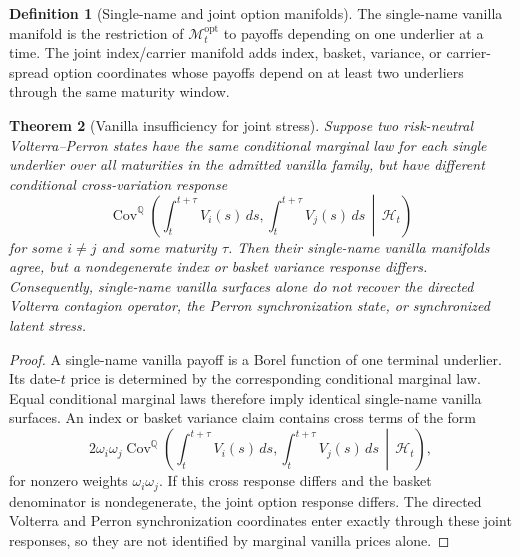 \documentclass[11pt,a4paper]{amsart}
\theoremstyle{plain}
\newtheorem{theorem}{Theorem}[section]
\theoremstyle{definition}
\newtheorem{definition}[theorem]{Definition}
\theoremstyle{remark}
\DeclareMathOperator{\Cov}{Cov}
\newcommand{\QQ}{\mathbb{Q}}
\newcommand{\cH}{\mathcal{H}}
\newcommand{\cM}{\mathcal{M}}
\newcommand{\dd}{\,d}
\begin{document}
\begin{definition}[Single-name and joint option manifolds]\label{def:single-joint-manifolds}
The single-name vanilla manifold is the restriction of \(\cM_t^{\mathrm{opt}}\) to payoffs
depending on one underlier at a time.  The joint index/carrier manifold adds index, basket,
variance, or carrier-spread option coordinates whose payoffs depend on at least two underliers
through the same maturity window.
\end{definition}

\begin{theorem}[Vanilla insufficiency for joint stress]\label{thm:vanilla-insufficiency}
Suppose two risk-neutral Volterra--Perron states have the same conditional marginal law for each
single underlier over all maturities in the admitted vanilla family, but have different conditional
cross-variation response
\[
        \Cov^\QQ\!\left(
        \int_t^{t+\tau}V_i(s)\dd s,
        \int_t^{t+\tau}V_j(s)\dd s
        \,\middle|\,\cH_t
        \right)
\]
for some \(i\ne j\) and some maturity \(\tau\).  Then their single-name vanilla manifolds agree,
but a nondegenerate index or basket variance response differs.  Consequently, single-name
vanilla surfaces alone do not recover the directed Volterra contagion operator, the Perron
synchronization state, or synchronized latent stress.
\end{theorem}

\begin{proof}
A single-name vanilla payoff is a Borel function of one terminal underlier.  Its date-\(t\) price
is determined by the corresponding conditional marginal law.  Equal conditional marginal laws
therefore imply identical single-name vanilla surfaces.  An index or basket variance claim
contains cross terms of the form
\[
        2\omega_i\omega_j
        \Cov^\QQ\!\left(
        \int_t^{t+\tau}V_i(s)\dd s,
        \int_t^{t+\tau}V_j(s)\dd s
        \,\middle|\,\cH_t
        \right),
\]
for nonzero weights \(\omega_i\omega_j\).  If this cross response differs and the basket
denominator is nondegenerate, the joint option response differs.  The directed Volterra and
Perron synchronization coordinates enter exactly through these joint responses, so they are not
identified by marginal vanilla prices alone.
\end{proof}
\end{document}

